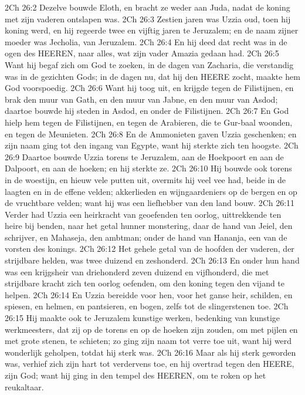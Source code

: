 2Ch 26:2  Dezelve bouwde Eloth, en bracht ze weder aan Juda, nadat de koning met zijn vaderen ontslapen was.
2Ch 26:3  Zestien jaren was Uzzia oud, toen hij koning werd, en hij regeerde twee en vijftig jaren te Jeruzalem; en de naam zijner moeder was Jecholia, van Jeruzalem.
2Ch 26:4  En hij deed dat recht was in de ogen des HEEREN, naar alles, wat zijn vader Amazia gedaan had.
2Ch 26:5  Want hij begaf zich om God te zoeken, in de dagen van Zacharia, die verstandig was in de gezichten Gods; in de dagen nu, dat hij den HEERE zocht, maakte hem God voorspoedig.
2Ch 26:6  Want hij toog uit, en krijgde tegen de Filistijnen, en brak den muur van Gath, en den muur van Jabne, en den muur van Asdod; daartoe bouwde hij steden in Asdod, en onder de Filistijnen.
2Ch 26:7  En God hielp hem tegen de Filistijnen, en tegen de Arabieren, die te Gur-baal woonden, en tegen de Meunieten.
2Ch 26:8  En de Ammonieten gaven Uzzia geschenken; en zijn naam ging tot den ingang van Egypte, want hij sterkte zich ten hoogste.
2Ch 26:9  Daartoe bouwde Uzzia torens te Jeruzalem, aan de Hoekpoort en aan de Dalpoort, en aan de hoeken; en hij sterkte ze.
2Ch 26:10  Hij bouwde ook torens in de woestijn, en hieuw vele putten uit, overmits hij veel vee had, beide in de laagten en in de effene velden; akkerlieden en wijngaardeniers op de bergen en op de vruchtbare velden; want hij was een liefhebber van den land bouw.
2Ch 26:11  Verder had Uzzia een heirkracht van geoefenden ten oorlog, uittrekkende ten heire bij benden, naar het getal hunner monstering, daar de hand van Jeiel, den schrijver, en Mahaseja, den ambtman; onder de hand van Hananja, een van de vorsten des konings.
2Ch 26:12  Het gehele getal van de hoofden der vaderen, der strijdbare helden, was twee duizend en zeshonderd.
2Ch 26:13  En onder hun hand was een krijgsheir van driehonderd zeven duizend en vijfhonderd, die met strijdbare kracht zich ten oorlog oefenden, om den koning tegen den vijand te helpen.
2Ch 26:14  En Uzzia bereidde voor hen, voor het ganse heir, schilden, en spiesen, en helmen, en pantsieren, en bogen, zelfs tot de slingerstenen toe.
2Ch 26:15  Hij maakte ook te Jeruzalem kunstige werken, bedenking van kunstige werkmeesters, dat zij op de torens en op de hoeken zijn zouden, om met pijlen en met grote stenen, te schieten; zo ging zijn naam tot verre toe uit, want hij werd wonderlijk geholpen, totdat hij sterk was.
2Ch 26:16  Maar als hij sterk geworden was, verhief zich zijn hart tot verdervens toe, en hij overtrad tegen den HEERE, zijn God; want hij ging in den tempel des HEEREN, om te roken op het reukaltaar.
